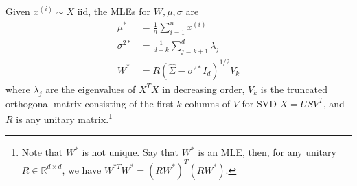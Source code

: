   \begin{theorem}
    Given $x^{(i)} \sim X$ iid, the MLEs for $W, \mu, \sigma$ are 
    \begin{align}
      \mu^\ast & = \frac{1}{n} \sum_{i=1}^n x^{(i)} \\
      \sigma^{2 \ast} & = \frac{1}{d-k} \sum_{j=k+1}^d \lambda_j \\
      W^\ast & = R (\hat{\Sigma} - \sigma^{2 \ast} I_d )^{1/2} V_k
    \end{align}
    where $\lambda_j$ are the eigenvalues of $X^T X$ in decreasing order, $V_k$ is the truncated orthogonal matrix consisting of the first $k$ columns of $V$ for SVD $X = U S V^T$, and $R$ is any unitary matrix.\footnote{Note that $W^{\ast}$ is not unique. Say that $W^\ast$ is an MLE, then, for any unitary $R \in \mathbb{R}^{d \times d}$, we have $W^{\ast T} W^\ast = (R W^\ast)^T (R W^\ast)$.} 
  \end{theorem}
